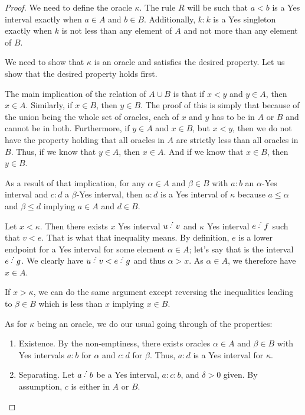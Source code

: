 \documentclass[12pt]{article}
\begin{document}
\begin{proof}
    We need to define the oracle $\kappa$. The rule $R$ will be such that $a \lt b$ is a Yes interval exactly when $a\in A$ and $b \in B$. Additionally, $k:k$ is a Yes singleton exactly when $k$ is not less than any element of $A$ and not more than any element of $B$. 

    We need to show that $\kappa$ is an oracle and satisfies the desired property. Let us show that the desired property holds first. 

    The main implication of the relation of $A \cup B$ is that if $x < y$ and $y \in A$, then $x \in A$. Similarly, if $x \in B$, then $y \in B$. The proof of this is simply that because of the union being the whole set of oracles, each of $x$ and $y$ has to be in $A$ or $B$ and cannot be in both. Furthermore, if $y \in A$ and $x \in B$, but $x < y$, then we do not have the property holding that all oracles in $A$ are strictly less than all oracles in $B$. Thus, if we know that $y \in A$, then $x \in A$. And if we know that $x \in B$, then $y \in B$.

    As a result of that implication, for any $\alpha \in A$ and $\beta \in B$ with $a:b$ an $\alpha$-Yes interval and $c:d$ a $\beta$-Yes interval, then $a:d$ is a Yes interval of $\kappa$ because $a \leq \alpha$ and $\beta \leq d$ implying $a \in A$ and $d \in B$. 

    Let $ x < \kappa$. Then there exists $x$ Yes interval $u\lte v$ and $\kappa$ Yes interval $e\lte f$ such that $v < e$. That is what that inequality means. By definition, $e$ is a lower endpoint for a Yes interval for some element $\alpha \in A$; let's say that is the interval $e\lte g$. We clearly have $ u \lte v < e \lte g$ and thus $\alpha > x$. As $\alpha \in A$, we therefore have $x \in A$. 

    If $x > \kappa$, we can do the same argument except reversing the inequalities leading to $\beta \in B$ which is less than $x$ implying $x \in B$.

    As for $\kappa$ being an oracle, we do our usual going through of the properties: 
    \begin{enumerate}
        \item Existence. By the non-emptiness, there exists oracles $\alpha \in A$ and $\beta \in B$ with Yes intervals $a:b$ for $\alpha$ and $c:d$ for $\beta$. Thus, $a:d$ is a Yes interval for $\kappa$. 
        \item Separating. Let $a\lte b$ be a Yes interval, $a:c:b$, and $\delta >0 $ given.  By assumption, $c$ is either in $A$ or $B$. 
        

\end{enumerate}
\end{proof}
\end{document}

